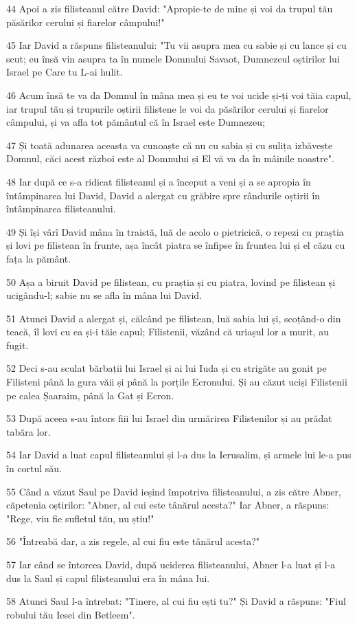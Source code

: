 \par 44 Apoi a zis filisteanul către David: "Apropie-te de mine și voi da trupul tău păsărilor cerului și fiarelor câmpului!"
\par 45 Iar David a răspuns filisteanului: "Tu vii asupra mea cu sabie și cu lance și cu scut; eu însă vin asupra ta în numele Domnului Savaot, Dumnezeul oștirilor lui Israel pe Care tu L-ai hulit.
\par 46 Acum însă te va da Domnul în mâna mea și eu te voi ucide și-ți voi tăia capul, iar trupul tău și trupurile oștirii filistene le voi da păsărilor cerului și fiarelor câmpului, și va afla tot pământul că în Israel este Dumnezeu;
\par 47 Și toată adunarea aceasta va cunoaște că nu cu sabia și cu sulița izbăvește Domnul, căci acest război este al Domnului și El vă va da în mâinile noastre".
\par 48 Iar după ce s-a ridicat filisteanul și a început a veni și a se apropia în întâmpinarea lui David, David a alergat cu grăbire spre rândurile oștirii în întâmpinarea filisteanului.
\par 49 Și își vârî David mâna în traistă, luă de acolo o pietricică, o repezi cu praștia și lovi pe filistean în frunte, așa încât piatra se înfipse în fruntea lui și el căzu cu fața la pământ.
\par 50 Așa a biruit David pe filistean, cu praștia și cu piatra, lovind pe filistean și ucigându-l; sabie nu se afla în mâna lui David.
\par 51 Atunci David a alergat și, călcând pe filistean, luă sabia lui și, scoțând-o din teacă, îl lovi cu ea și-i tăie capul; Filistenii, văzând că uriașul lor a murit, au fugit.
\par 52 Deci s-au sculat bărbații lui Israel și ai lui Iuda și cu strigăte au gonit pe Filisteni până la gura văii și până la porțile Ecronului. Și au căzut uciși Filistenii pe calea Șaaraim, până la Gat și Ecron.
\par 53 După aceea s-au întors fiii lui Israel din urmărirea Filistenilor și au prădat tabăra lor.
\par 54 Iar David a luat capul filisteanului și l-a dus la Ierusalim, și armele lui le-a pus în cortul său.
\par 55 Când a văzut Saul pe David ieșind împotriva filisteanului, a zis către Abner, căpetenia oștirilor: "Abner, al cui este tânărul acesta?" Iar Abner, a răspuns: "Rege, viu fie sufletul tău, nu știu!"
\par 56 "Întreabă dar, a zis regele, al cui fiu este tânărul acesta?"
\par 57 Iar când se întorcea David, după uciderea filisteanului, Abner l-a luat și l-a dus la Saul și capul filisteanului era în mâna lui.
\par 58 Atunci Saul l-a întrebat: "Tinere, al cui fiu ești tu?" Și David a răspuns: "Fiul robului tău Iesei din Betleem".

